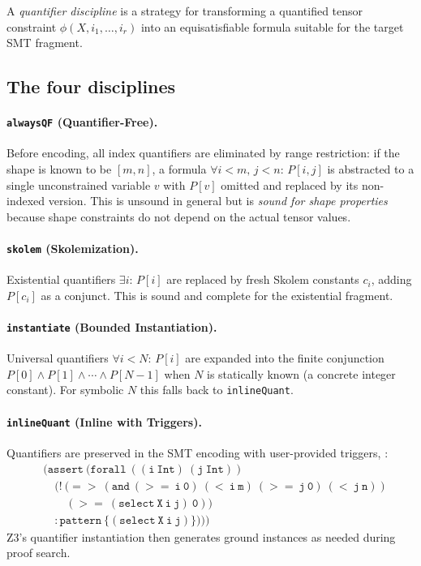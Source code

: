 \documentclass[11pt]{article}
\begin{document}
\begin{definition}
\label{def:qdisc}
A \emph{quantifier discipline} is a strategy for transforming a
quantified tensor constraint $\phi(X,i_1,\ldots,i_r)$ into an
equisatisfiable formula suitable for the target SMT fragment.
\end{definition}

\subsection{The four disciplines}

\paragraph{\texttt{alwaysQF} (Quantifier-Free).}
Before encoding, all index quantifiers are eliminated by range
restriction: if the shape is known to be $[m,n]$, a formula
$\forall i < m,\, j < n:\, P[i,j]$ is abstracted to a single
unconstrained variable $v$ with $P[v]$ omitted and replaced by
its non-indexed version.  This is unsound in general but is
\emph{sound for shape properties} because shape constraints do not
depend on the actual tensor values.

\paragraph{\texttt{skolem} (Skolemization).}
Existential quantifiers $\exists i:\, P[i]$ are replaced by fresh
Skolem constants $c_i$, adding $P[c_i]$ as a conjunct.  This is
sound and complete for the existential fragment.

\paragraph{\texttt{instantiate} (Bounded Instantiation).}
Universal quantifiers $\forall i < N:\, P[i]$ are expanded into the
finite conjunction $P[0] \wedge P[1] \wedge \cdots \wedge P[N-1]$
when $N$ is statically known (a concrete integer constant).  For
symbolic $N$ this falls back to \texttt{inlineQuant}.

\paragraph{\texttt{inlineQuant} (Inline with Triggers).}
Quantifiers are preserved in the SMT encoding with user-provided
triggers, \eg:
\begin{align*}
&\mathtt{(assert\ (forall\ ((i\ Int)\ (j\ Int))} \\
&\quad\mathtt{(!\  (=>\ (and\ (>=\ i\ 0)\ (<\ i\ m)\ (>=\ j\ 0)\ (<\ j\ n))} \\
&\quad\quad\mathtt{(>=\ (select\ X\ i\ j)\ 0))} \\
&\quad\mathtt{:pattern\ \{(select\ X\ i\ j)\})))}
\end{align*}
Z3's quantifier instantiation then generates ground instances as
needed during proof search.
\end{document}
